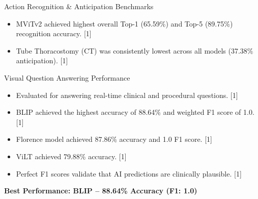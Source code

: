 \documentclass[aspectratio=169, 10pt]{beamer}
\begin{document}
\begin{frame}{Action Recognition \& Anticipation Benchmarks}
    \vspace{0.15cm}
    \begin{itemize}
        \setlength{\itemsep}{4pt}
        \item MViTv2 achieved highest overall Top-1 (65.59\%) and Top-5 (89.75\%) recognition accuracy. [1]
        \item Tube Thoracostomy (CT) was consistently lowest across all models (37.38\% anticipation). [1]
    \end{itemize}
\end{frame}

\begin{frame}{Visual Question Answering Performance}
    \vspace{0.25cm}
    \begin{itemize}
        \setlength{\itemsep}{7pt}
        \item Evaluated for answering real-time clinical and procedural questions. [1]
        \item BLIP achieved the highest accuracy of 88.64\% and weighted F1 score of 1.0. [1]
        \item Florence model achieved 87.86\% accuracy and 1.0 F1 score. [1]
        \item ViLT achieved 79.88\% accuracy. [1]
        \item Perfect F1 scores validate that AI predictions are clinically plausible. [1]
    \end{itemize}

    \vspace{0.2cm}
    \centering
    \textbf{Best Performance: BLIP – 88.64\% Accuracy (F1: 1.0)}
\end{frame}
\end{document}
